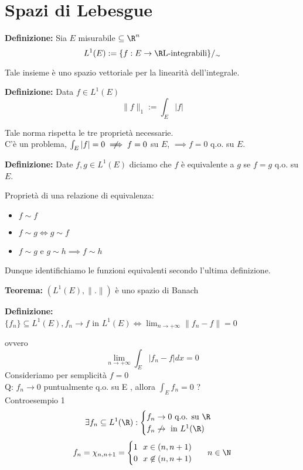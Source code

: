 \section{Spazi di Lebesgue}
\begin{tcolorbox}
	\textbf{Definizione: }Sia  $E$  misurabile  $\subseteq\R^n$ 
	  \[L^1(E):= \{f:E\to  \R    \text{L-integrabili} \} /_{\sim}\]  
\end{tcolorbox}
Tale insieme è uno spazio vettoriale per la linearità dell'integrale.
\begin{tcolorbox}
	\textbf{Definizione: }Data  $f \in  L ^1(E)$ 
  \[\|f\|_1:=\int_{E}^{} |f|\]  
\end{tcolorbox}
Tale norma rispetta le tre proprietà necessarie.
\\C'è un problema,  $\int_{E}^{} |f|=0\centernot\implies f=0$  su $E$,  $\implies f=0$  q.o. su  $E$.
\begin{tcolorbox}
	\textbf{Definizione: }Date  $f,g\in  L ^1(E)$  diciamo che  $f$  è equivalente a  $g$  se  $f=g$  q.o. su  $E$.
\end{tcolorbox}
Proprietà di una relazione di equivalenza:
\begin{itemize}
	\item $f\sim f$ 
	\item $f\sim g \iff g\sim f$ 
	\item $ f\sim g$ e $g\sim h\implies f\sim h$ 
\end{itemize}
Dunque identifichiamo le funzioni equivalenti secondo l'ultima definizione.
\begin{tcolorbox}
	\textbf{Teorema: }$(L^1(E),\|.\|)$  è uno spazio di Banach
\end{tcolorbox}
\begin{tcolorbox}
	\textbf{Definizione: }\\$\{f_n\} \subseteq L^1(E),f_n\to f$ in $L^1(E) \iff \lim_{n \to +\infty} \|f_n-f\|=0$ 
\end{tcolorbox}
ovvero
\[\lim_{n\to +\infty} \int_{E}^{} |f_n-f|dx=0\] 
Consideriamo per semplicità  $f=0$ 
\\Q: $f_n\to  0$  puntualmente q.o. su  E , allora  $\int_{E}^{} f_n=0$ ? 
\\Controesempio 1
\[\exists f_n\subseteq  L^1(\R): \begin{cases}
	f_n\to 0\text{ q.o. su } \R\\
	f_n \not\to \text{ in }L^1(\R)
\end{cases}
\]
\[f_n=\chi_{n, n+1}=\begin{cases}
	1\ \ x\in(n,n+1)
	\\0\ \ x \not\in (n,n+1)
\end{cases}\ \ n\in \N
\]
